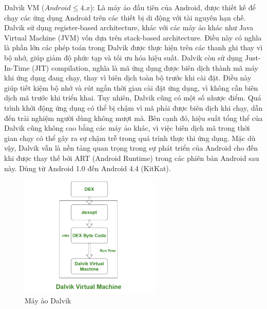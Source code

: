 \begin{flushleft}
  \hspace*{0.8cm}Dalvik VM ($Android \leq 4.x$): Là máy ảo đầu tiên của Android,  được thiết kế để chạy các ứng dụng Android trên các thiết bị di động với tài nguyên hạn chế. Dalvik sử dụng register-based architecture, khác với các máy ảo khác như Java Virtual Machine (JVM) vốn dựa trên stack-based architecture. Điều này có nghĩa là phần lớn các phép toán trong Dalvik được thực hiện trên các thanh ghi thay vì bộ nhớ, giúp giảm độ phức tạp và tối ưu hóa hiệu suất. Dalvik còn sử dụng Just-In-Time (JIT) compilation, nghĩa là mã ứng dụng được biên dịch thành mã máy khi ứng dụng đang chạy, thay vì biên dịch toàn bộ trước khi cài đặt. Điều này giúp tiết kiệm bộ nhớ và rút ngắn thời gian cài đặt ứng dụng, vì không cần biên dịch mã trước khi triển khai. Tuy nhiên, Dalvik cũng có một số nhược điểm. Quá trình khởi động ứng dụng có thể bị chậm vì mã phải được biên dịch khi chạy, dẫn đến trải nghiệm người dùng không mượt mà. Bên cạnh đó, hiệu suất tổng thể của Dalvik cũng không cao bằng các máy ảo khác, vì việc biên dịch mã trong thời gian chạy có thể gây ra sự chậm trễ trong quá trình thực thi ứng dụng. Mặc dù vậy, Dalvik vẫn là nền tảng quan trọng trong sự phát triển của Android cho đến khi được thay thế bởi ART (Android Runtime) trong các phiên bản Android sau này.
  Dùng từ Android 1.0 đến Android 4.4 (KitKat)\cite{art-dalvik}.
  \begin{figure}[H] 
    \centering
    \includegraphics[width=0.6\textwidth]{images/DalvikVM.png}
    \caption{Máy ảo Dalvik}
    \label{fig:android}
\end{figure}  
\end{flushleft}

